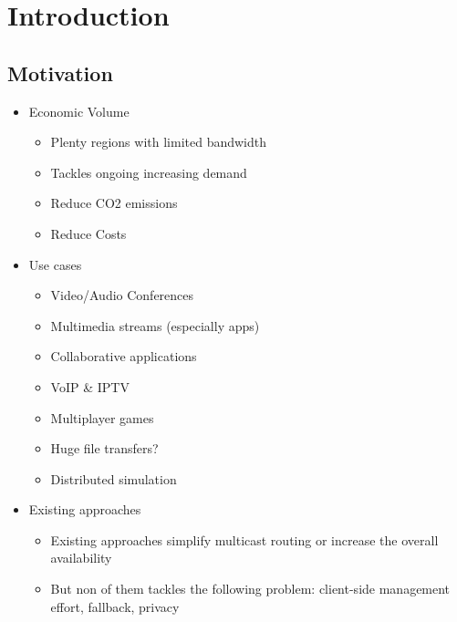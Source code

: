 \chapter{Introduction} %
\label{chap:Introduction}


\section{Motivation} %
\label{sec:Motivation}
\begin{itemize}\itemsep0em
    \item Economic Volume
    \begin{itemize}\itemsep0em
        \item Plenty regions with limited bandwidth
        \item Tackles ongoing increasing demand
        \item Reduce CO2 emissions
        \item Reduce Costs
    \end{itemize}
    \item Use cases
    \begin{itemize}\itemsep0em
        \item Video/Audio Conferences
        \item Multimedia streams (especially apps)
        \item Collaborative applications
        \item VoIP \& IPTV
        \item Multiplayer games
        \item Huge file transfers?
        \item Distributed simulation
    \end{itemize}
    \item Existing approaches
    \begin{itemize}\itemsep0em
        \item Existing approaches simplify multicast routing or increase the overall availability
        \item But non of them tackles the following problem: client-side management effort, fallback, privacy
    \end{itemize}
\end{itemize}


